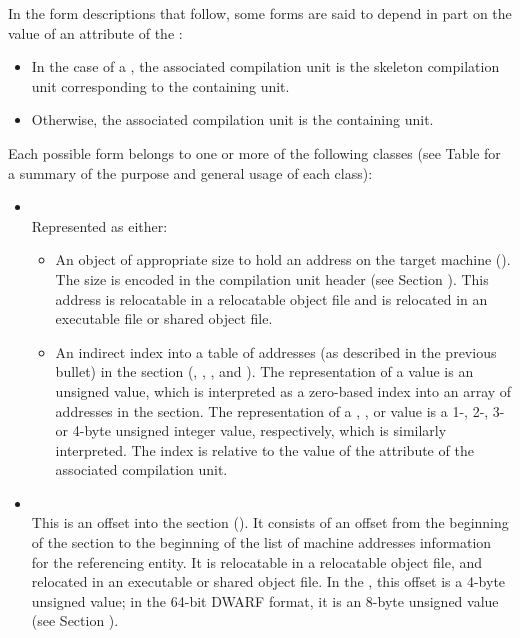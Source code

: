 In the form descriptions that follow, some forms are said
to depend in part on the value of an attribute of the
:
\begin{itemize}
\item
In the case of a \splitDWARFobjectfile{}, the associated
compilation unit is the skeleton compilation unit corresponding 
to the containing unit.
\item Otherwise, the associated compilation unit 
is the containing unit.
\end{itemize}

Each possible form belongs to one or more of the following classes
(see Table  for a summary of
the purpose and general usage of each class):

\begin{itemize}

\item \CLASSaddress \\
Represented as either:
\begin{itemize}
\item An object of appropriate size to hold an
address on the target machine (\DWFORMaddrTARG). 
The size is encoded in the compilation unit header 
(see Section ).
This address is relocatable in a relocatable object file and
is relocated in an executable file or shared object file.

\item An indirect index into a table of addresses (as 
described in the previous bullet) in the \dotdebugaddr{} section 
(\DWFORMaddrxTARG, \DWFORMaddrxoneTARG, \DWFORMaddrxtwoTARG, 
\DWFORMaddrxthreeTARG{} and \DWFORMaddrxfourTARG). 
The representation of a \DWFORMaddrxNAME{} value is an unsigned
 value, which is interpreted as a zero-based 
index into an array of addresses in the \dotdebugaddr{} section.
The representation of a \DWFORMaddrxoneNAME, \DWFORMaddrxtwoNAME, 
\DWFORMaddrxthreeNAME{} or \DWFORMaddrxfourNAME{} value is a 
1-, 2-, 3- or 4-byte unsigned integer value, respectively,
which is similarly interpreted.
The index is relative to the value of the \DWATaddrbase{} attribute 
of the associated compilation unit.

\end{itemize}

\item \CLASSaddrptr \\
This is an offset into the \dotdebugaddr{} section (\DWFORMsecoffset). It
consists of an offset from the beginning of the \dotdebugaddr{} section to the
beginning of the list of machine addresses information for the
referencing entity. It is relocatable in
a relocatable object file, and relocated in an executable or
shared object file. In the \thirtytwobitdwarfformat, this offset
is a 4-byte unsigned value; in the 64-bit DWARF
format, it is an 8-byte unsigned value (see Section
).


\end{itemize}
